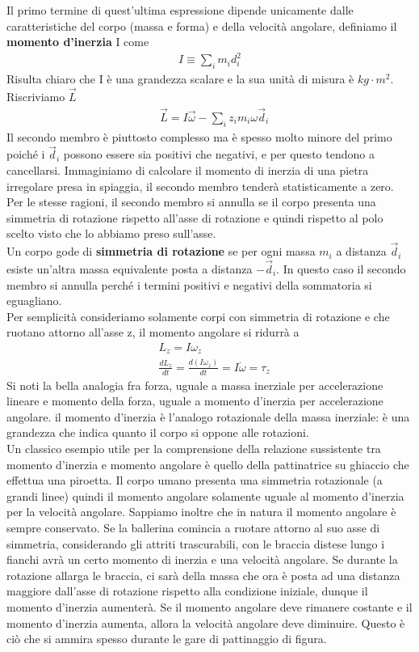 Il primo termine di quest'ultima espressione dipende unicamente dalle caratteristiche del corpo (massa e forma) e della velocità angolare, definiamo il \textbf{momento d'inerzia} I come
\begin{align*}
	I \equiv \sum_i m_i d_i^2
\end{align*}
Risulta chiaro che I è una grandezza scalare e la sua unità di misura è $kg \cdot m^2$. Riscriviamo $\vec{L}$
\begin{align*}
&\vec{L} =  I \vec{\omega} - \sum_i z_i m_i \omega \vec{d}_i 
\end{align*} 
Il secondo membro è piuttosto complesso ma è spesso molto minore del primo poiché i $\vec{d}_i$ possono essere sia positivi che negativi, e per questo tendono a cancellarsi. Immaginiamo di calcolare il momento di inerzia di una pietra irregolare presa in spiaggia, il secondo membro tenderà statisticamente a zero. Per le stesse ragioni, il secondo membro si annulla se il corpo presenta una simmetria di rotazione rispetto all'asse di rotazione e quindi rispetto al polo scelto visto che lo abbiamo preso sull'asse.\\
Un corpo gode di \textbf{simmetria di rotazione} se per ogni massa $m_i$ a distanza $\vec{d}_i$ esiste un'altra massa equivalente posta a distanza $-\vec{d}_i$. In questo caso il secondo membro si annulla perché i termini positivi e negativi della sommatoria si eguagliano.\\
Per semplicità consideriamo solamente corpi con simmetria di rotazione e che ruotano attorno all'asse z, il momento angolare si ridurrà a
\begin{align*}
	&L_z = I \omega_z \\
	&\frac{d L_z}{dt} = \frac{d(I \omega_z)}{dt} = I \dot{\omega} = \tau_z
\end{align*}
Si noti la bella analogia fra forza, uguale a massa inerziale per accelerazione lineare e momento della forza, uguale a momento d'inerzia per accelerazione angolare. il momento d'inerzia è l'analogo rotazionale della massa inerziale: è una grandezza che indica quanto il corpo si oppone alle rotazioni.\\
Un classico esempio utile per la comprensione della relazione sussistente tra momento d'inerzia e momento angolare è quello della pattinatrice su ghiaccio che effettua una piroetta. Il corpo umano presenta una simmetria rotazionale (a grandi linee) quindi il momento angolare solamente uguale al momento d'inerzia per la velocità angolare. Sappiamo inoltre che in natura il momento angolare è sempre conservato. Se la ballerina comincia a ruotare attorno al suo asse di simmetria, considerando gli attriti trascurabili, con le braccia distese lungo i fianchi avrà un certo momento di inerzia e una velocità angolare. Se durante la rotazione allarga le braccia, ci sarà della massa che ora è posta ad una distanza maggiore dall'asse di rotazione rispetto alla condizione iniziale, dunque il momento d'inerzia aumenterà. Se il momento angolare deve rimanere costante e il momento d'inerzia aumenta, allora la velocità angolare deve diminuire. Questo è ciò che si ammira spesso durante le gare di pattinaggio di figura. 
